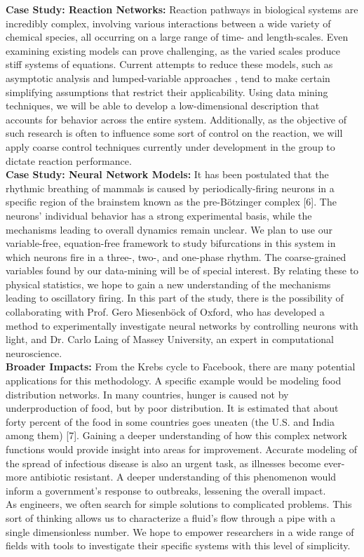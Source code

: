\documentclass[11pt]{article}
\begin{document}
\textbf{Case Study: Reaction Networks:} Reaction pathways in biological systems are incredibly complex, involving various interactions between a wide variety of chemical species, all occurring on  a large range of time- and length-scales. Even examining existing models can prove challenging, as the varied scales produce stiff systems of equations. Current attempts to reduce these models, such as asymptotic analysis and lumped-variable approaches \cite{non-linear reduction Daoutidis}, tend to make certain simplifying assumptions that restrict their applicability. Using data mining techniques, we will be able to develop a low-dimensional description that accounts for behavior across the entire system. Additionally, as the objective of such research is often to influence some sort of control on the reaction, we will apply coarse control techniques currently under development in the group to dictate reaction performance.
\\
\textbf{Case Study: Neural Network Models:} It has been postulated that the rhythmic breathing of mammals is caused by periodically-firing neurons in a specific region of the brainstem known as the pre-Bötzinger complex [6]. The neurons’ individual behavior has a strong experimental basis, while the mechanisms leading to overall dynamics remain unclear. We plan to use our variable-free, equation-free framework to study bifurcations in this system in which neurons fire in a three-, two-, and one-phase rhythm. The coarse-grained variables found by our data-mining will be of special interest. By relating these to physical statistics, we hope to gain a new understanding of the mechanisms leading to oscillatory firing. In this part of the study, there is the possibility of collaborating with Prof. Gero Miesenböck of Oxford, who has developed a method to experimentally investigate neural networks by controlling neurons with light, and Dr. Carlo Laing of Massey University, an expert in computational neuroscience.\\
\textbf{Broader Impacts:} From the Krebs cycle to Facebook, there are many potential applications for this methodology. A specific example would be modeling food distribution networks. In many countries, hunger is caused not by underproduction of food, but by poor distribution. It is estimated that about forty percent of the food in some countries goes uneaten (the U.S. and India among them) [7]. Gaining a deeper understanding of how this complex network functions would provide insight into areas for improvement. Accurate modeling of the spread of infectious disease is also an urgent task, as illnesses become ever-more antibiotic resistant. A deeper understanding of this phenomenon would inform a government’s response to outbreaks, lessening the overall impact.\\
\indent As engineers, we often search for simple solutions to complicated problems. This sort of thinking allows us to characterize a fluid's flow through a pipe with a single dimensionless number. We hope to empower researchers in a wide range of fields with tools to investigate their specific systems with this level of simplicity.\\
\end{document}
